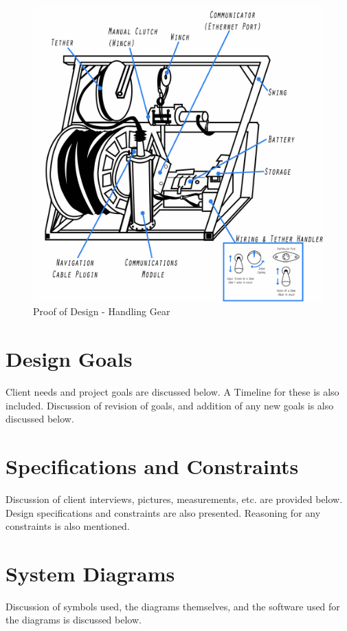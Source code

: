 \documentclass[12pt]{article}
\begin{document}
{		\begin{figure}[!htb]
			\centering
			\includegraphics[width = 115mm]{assets/handling_gear.jpg}
			\caption{Proof of Design - Handling Gear \label{overflow}}
		\end{figure}
		
		\clearpage

	\newpage
		
	\section{Design Goals}
	Client needs and project goals are discussed below. A Timeline for these is also included. Discussion of revision of goals, and addition of any new goals is also discussed below.
	
	\newpage	
	
	\section{Specifications and Constraints}
	Discussion of client interviews, pictures, measurements, etc. are provided below. Design specifications and constraints are also presented. Reasoning for any constraints is also mentioned.
	
	\newpage
						
	\section{System Diagrams}
	Discussion of symbols used, the diagrams themselves, and the software used for the diagrams is discussed below.
	
}
\end{document}

